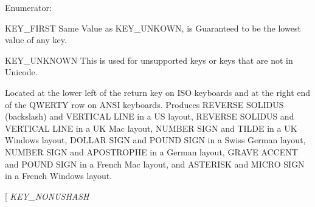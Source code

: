 \begin{Desc}
\item[Enumerator: ]\par
\begin{description}
\item[{\em 
\hypertarget{classMezzanine_1_1MetaCode_a3b5633f0145bf3287cf53a3f05b5563ca1ccda5063e3d1e72a9eacd70b030342e}{
KEY\_\-FIRST}
\label{classMezzanine_1_1MetaCode_a3b5633f0145bf3287cf53a3f05b5563ca1ccda5063e3d1e72a9eacd70b030342e}
}]KEY\_\-FIRST Same Value as KEY\_\-UNKOWN, is Guaranteed to be the lowest value of any key. \item[{\em 
\hypertarget{classMezzanine_1_1MetaCode_a3b5633f0145bf3287cf53a3f05b5563ca9c3714a0de55dca42c122e5cbced974f}{
KEY\_\-UNKNOWN}
\label{classMezzanine_1_1MetaCode_a3b5633f0145bf3287cf53a3f05b5563ca9c3714a0de55dca42c122e5cbced974f}
}]KEY\_\-UNKNOWN This is used for unsupported keys or keys that are not in Unicode. \item[{\em 
\hypertarget{classMezzanine_1_1MetaCode_a3b5633f0145bf3287cf53a3f05b5563caf280c1704fc6955d872b8ff7f91693c4}{
KEY\_\-BACKSLASH}
\label{classMezzanine_1_1MetaCode_a3b5633f0145bf3287cf53a3f05b5563caf280c1704fc6955d872b8ff7f91693c4}
}]Located at the lower left of the return key on ISO keyboards and at the right end of the QWERTY row on ANSI keyboards. Produces REVERSE SOLIDUS (backslash) and VERTICAL LINE in a US layout, REVERSE SOLIDUS and VERTICAL LINE in a UK Mac layout, NUMBER SIGN and TILDE in a UK Windows layout, DOLLAR SIGN and POUND SIGN in a Swiss German layout, NUMBER SIGN and APOSTROPHE in a German layout, GRAVE ACCENT and POUND SIGN in a French Mac layout, and ASTERISK and MICRO SIGN in a French Windows layout. \item[{\em 
\hypertarget{classMezzanine_1_1MetaCode_a3b5633f0145bf3287cf53a3f05b5563cad905793c1a50f81dc4d779df8eba2964}{
KEY\_\-NONUSHASH}
\label{classMezzanine_1_1MetaCode_a3b5633f0145bf3287cf53a3f05b5563cad905793c1a50f81dc4d779df8eba2964}
}
\end{description}
\end{Desc}
